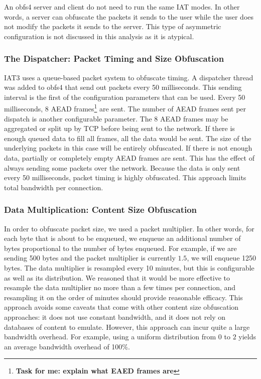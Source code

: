 \documentclass[11pt]{article}
\begin{document}
An obfs4 server and client do not need to run the same IAT modes. In other words, a server can obfuscate the packets it sends to the user while the user does not modify the packets it sends to the server. This type of asymmetric configuration is not discussed in this analysis as it is atypical.

\subsubsection{The Dispatcher: Packet Timing and Size Obfuscation}
IAT3 uses a queue-based packet system to obfuscate timing. A dispatcher thread was added to obfs4 that send out packets every 50 milliseconds. This sending interval is the first of the configuration parameters that can be used. Every 50 milliseconds, 8 AEAD frames\footnote{\textbf{Task for me: explain what EAED frames are}} are sent. The number of AEAD frames sent per dispatch is another configurable parameter. The 8 AEAD frames may be aggregated or split up by TCP before being sent to the network. If there is enough queued data to fill all frames, all the data would be sent. The size of the underlying packets in this case will be entirely obfuscated. If there is not enough data, partially or completely empty AEAD frames are sent. This has the effect of always sending some packets over the network. Because the data is only sent every 50 milliseconds, packet timing is highly obfuscated. This approach limits total bandwidth per connection.

\subsubsection{Data Multiplication: Content Size Obfuscation}
In order to obfuscate packet size, we used a packet multiplier. In other words, for each byte that is about to be enqueued, we enqueue an additional number of bytes proportional to the number of bytes enqueued. For example, if we are sending 500 bytes and the packet multiplier is currently $1.5$, we will enqueue 1250 bytes. The data multiplier is resampled every 10 minutes, but this is configurable as well as its distribution. We reasoned that it would be more effective to resample the data multiplier no more than a few times per connection, and resampling it on the order of minutes should provide reasonable efficacy. This approach avoids some caveats that come with other content size obfuscation approaches: it does not use constant bandwidth, and it does not rely on databases of content to emulate. However, this approach can incur quite a large bandwidth overhead. For example, using a uniform distribution from $0$ to $2$ yields an average bandwidth overhead of 100\%.
\end{document}
